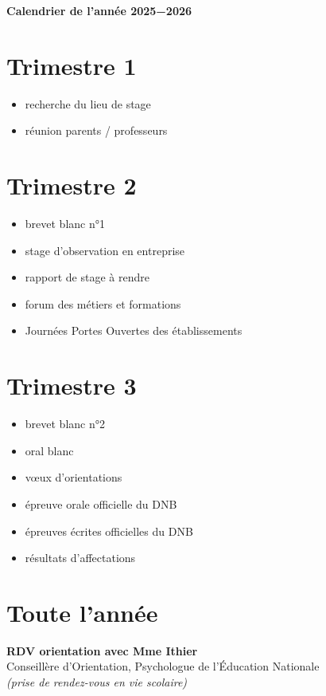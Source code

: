 \documentclass[11pt,a5paper]{article}
\newcommand{\ligne}{{\color{gray!60}\hrulefill}}
\begin{document}
\begin{center}
\LARGE\textbf{Calendrier de l’année 2025−2026}
\end{center}

\section*{Trimestre 1}
\begin{itemize}
  \item recherche du lieu de stage \ligne
  \item réunion parents / professeurs \ligne
\end{itemize}

\section*{Trimestre 2}
\begin{itemize}
  \item brevet blanc n°1 \ligne
  \item stage d'observation en entreprise \ligne
  \item rapport de stage à rendre \ligne
  \item forum des métiers et formations \ligne
  \item Journées Portes Ouvertes des établissements \ligne
\end{itemize}

\section*{Trimestre 3}
\begin{itemize}[itemsep=0.2em]
  \item brevet blanc n°2 \ligne
  \item oral blanc \ligne
  \item vœux d'orientations \ligne
  \item épreuve orale officielle du DNB \ligne
  \item épreuves écrites officielles du DNB \ligne
  \item résultats d’affectations \ligne
\end{itemize}

\section*{Toute l’année}
\textbf{RDV orientation avec Mme Ithier} \ligne \\
Conseillère d'Orientation, Psychologue de l'Éducation Nationale\\
\emph{(prise de rendez-vous en vie scolaire)}
\end{document}
